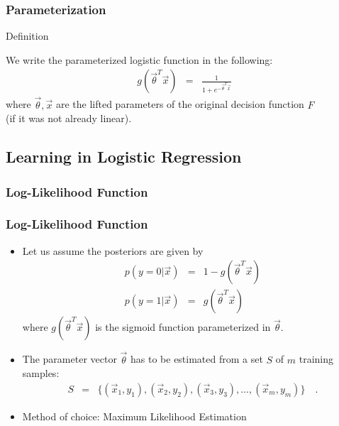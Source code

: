 \begin{frame}
  \frametitle{Parameterization \cont}

  \begin{citeblock}{Definition}

    We write the parameterized logistic function in the following:
    \begin{eqnarray*}
      g(\vec \theta^T \vec x) &=& \frac{1}{1+e^{-\vec \theta^T \vec x}}
    \end{eqnarray*}
    where $\vec \theta, \vec x$ are the lifted parameters of the original decision function $F$ \\
    (if it was not already linear).
  \end{citeblock}
\end{frame}


\subsection{Learning in Logistic Regression}

\subsubsection{Log-Likelihood Function}

\begin{frame}
  \frametitle{Log-Likelihood Function}
 
  \begin{itemize}
    \item Let us assume the posteriors are given by
      \begin{eqnarray*}
        p(y=0|\vec x) &=&  1-g(\vec \theta^T\vec x) \\
        p(y=1|\vec x) &=&  g(\vec \theta^T\vec x)
      \end{eqnarray*}
      where $g(\vec \theta^T\vec x)$ is the sigmoid function parameterized in $\vec \theta$. \\[.3cm]
    \item The parameter vector $\vec{\theta}$ has to be estimated from a set $S$ of $m$ training samples:
      \begin{eqnarray*}
        S &=& \{ (\vec x_1, y_1), (\vec x_2, y_2), (\vec x_3, y_3), \dots, (\vec x_m, y_m) \}\quad .
      \end{eqnarray*}
      \pause
    \item Method of choice: Maximum Likelihood Estimation
  \end{itemize}
\end{frame}


